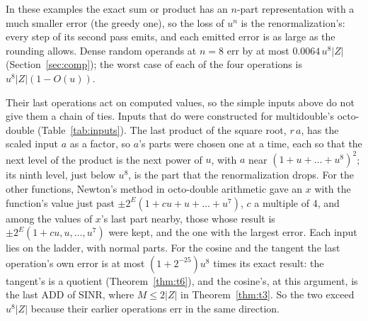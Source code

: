 \begin{remark}
In these examples the exact sum or product has an $n$-part representation with a much smaller error (the greedy one),
so the loss of $u^n$ is the renormalization's: every step of its second pass emits, and each emitted error is as large
as the rounding allows. Dense random operands at $n = 8$ err by at most $0.0064\,u^8|Z|$ (Section~\ref{sec:comp}); the worst case of each of the four operations is $u^8|Z|(1 - O(u))$.
\end{remark}

 Their last operations act on computed values, so the simple
inputs above do not give them a chain of ties. Inputs that do were constructed for multidouble's octo-double
(Table~\ref{tab:inputs}). The last product of the square root, $r\,a$, has the scaled input $a$ as a factor, so $a$'s
parts were chosen one at a time, each so that the next level of the product is the next power of $u$, with $a$ near $(1
+ u + \dots + u^8)^2$; its ninth level, just below $u^8$, is the part that the renormalization drops. For the other functions,
Newton's method in octo-double arithmetic gave an $x$ with the function's value just past $\pm2^E(1 + cu + u + \dots + u^7)$, $c$ a
multiple of 4, and among the values of $x$'s last part nearby, those whose result is $\pm2^E(1 + cu, u, \dots, u^7)$
were kept, and the one with the largest error. Each input lies on the ladder, with normal parts. For the cosine and the tangent the last operation's own error is
at most $(1 + 2^{-25})u^8$ times its exact result: the tangent's is a quotient (Theorem~\ref{thm:t6}), and the
cosine's, at this argument, is the last ADD of SINR, where $M \le 2|Z|$ in Theorem~\ref{thm:t3}. So the two exceed
$u^8|Z|$ because their earlier operations err in the same direction.


